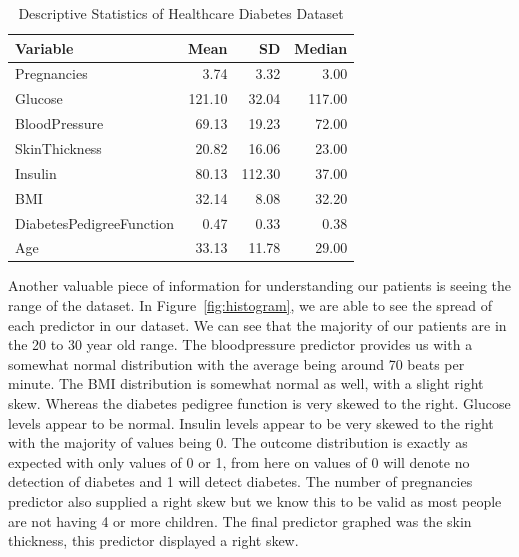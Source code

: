 \documentclass[12pt]{article}
\begin{document}
\begin{table}[ht]
    \caption{Descriptive Statistics of Healthcare Diabetes Dataset}
  \label{tab:ds}
\centering
\begin{tabular}{lrrr}
      \hline
    Variable & Mean & SD & Median \\ 
      \hline
      Pregnancies & 3.74 & 3.32 & 3.00 \\ 
      Glucose & 121.10 & 32.04 & 117.00 \\ 
      BloodPressure & 69.13 & 19.23 & 72.00 \\ 
      SkinThickness & 20.82 & 16.06 & 23.00 \\ 
      Insulin & 80.13 & 112.30 & 37.00 \\ 
      BMI & 32.14 & 8.08 & 32.20 \\ 
      DiabetesPedigreeFunction & 0.47 & 0.33 & 0.38 \\ 
      Age & 33.13 & 11.78 & 29.00 \\ 
       \hline
    \end{tabular}
    \end{table}

  Another valuable piece of information for understanding our patients is seeing the range of the dataset. In Figure~\ref{fig:histogram}, we
  are able to see the spread of each predictor in our dataset. We can see that the majority of our patients are in the 20 to 30 year old range. 
  The bloodpressure predictor provides us with a somewhat normal distribution with the average being around 70 beats per minute. The BMI
  distribution is somewhat normal as well, with a slight right skew. Whereas the diabetes pedigree function is very skewed to the right. Glucose
  levels appear to be normal. Insulin levels appear to be very skewed to the right with the majority of values being 0. The outcome distribution
  is exactly as expected with only values of 0 or 1, from here on values of 0 will denote no detection of diabetes and 1 will detect diabetes. The
  number of pregnancies predictor also supplied a right skew but we know this to be valid as most people are not having 4 or more children. The 
  final predictor graphed was the skin thickness, this predictor displayed a right skew.
\end{document}
